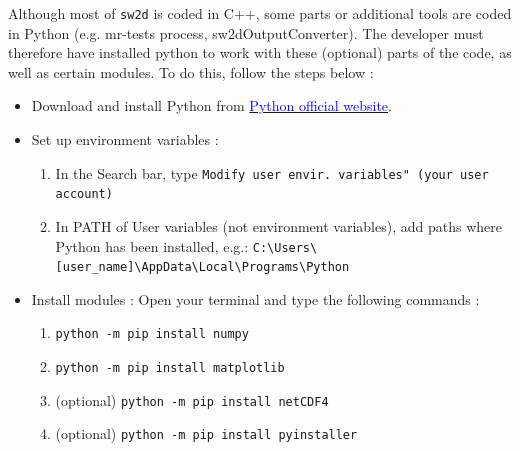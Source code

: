 Although most of \texttt{sw2d} is coded in C++, some parts or additional tools are coded in Python (e.g. mr-tests process, sw2dOutputConverter).
The developer must therefore have installed python to work with these (optional) parts of the code, as well as certain modules. To do this, follow the steps below :

\begin{itemize}
    \item Download and install Python from \href{https://www.python.org/downloads/}{\textcolor{blue}{Python official website}}.
    \item Set up environment variables :
    \begin{enumerate}
        \item In the Search bar, type \texttt{Modify user envir. variables" (your user account)}
        \item In PATH of User variables (not environment variables), add paths where Python has been installed, e.g.:
        \lstinline{C:\Users\[user_name]\AppData\Local\Programs\Python}
    \end{enumerate}
    \item Install modules : Open your terminal and type the following commands :
    \begin{enumerate}
        \item \lstinline{python -m pip install numpy}
        \item \lstinline{python -m pip install matplotlib}
        \item (optional) \lstinline{python -m pip install netCDF4}
        \item (optional) \lstinline{python -m pip install pyinstaller}
    \end{enumerate}
\end{itemize}


%
